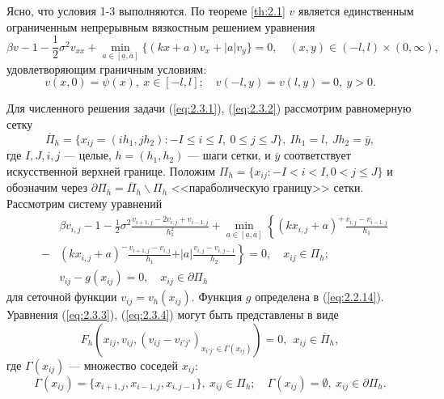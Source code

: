 Ясно, что условия 1-3 выполняются. По теореме \ref{th:2.1} $v$ является единственным ограниченным непрерывным вязкостным решением уравнения
\begin{equation} \label{eq:2.3.1}
\beta v -1-\frac{1}{2}\sigma^2 v_{xx}+\min_{a \in [\underline a,\overline{a}]}\{(kx+a)v_x+|a|v_y\}=0,\quad (x,y)\in (-l,l)\times(0,\infty),
\end{equation}
удовлетворяющим граничным условиям:
\begin{equation} \label{eq:2.3.2}
v(x,0)=\psi(x),\ x\in [-l,l];\quad v(-l,y)=v(l,y)=0,\  y>0.
\end{equation}

Для численного решения задачи (\ref{eq:2.3.1}), (\ref{eq:2.3.2}) рассмотрим равномерную сетку
$$\overline \Pi_h=\{x_{ij}=(ih_1,jh_2): -I \le i \le I, \ 0 \le j \le J\}, \ I h_1=l, \ Jh_2=\overline y,$$
где $I,J,i,j$ --- целые, $h=(h_1,h_2)$ --- шаги сетки, и $\overline y$ соответствует искусственной верхней границе.
Положим $\Pi_h=\{x_{ij}:-I<i<I, 0<j\le J\}$ и обозначим через $\partial \Pi_h=\overline \Pi_h\backslash \Pi_h$ <<параболическую границу>> сетки. Рассмотрим систему уравнений
\begin{eqnarray}
&  &\beta v_{i,j} -1-\frac{1}{2}\sigma^2 \frac{v_{i+1,j}-2v_{i,j}+v_{i-1,j}}{h^2_1}+\min_{a \in [\underline a,\overline a]} \left\{ (k x_{i,j}+a)^+\frac{v_{i,j}-v_{i-1,j}}{h_1}\right.\nonumber\\
 &-& (k x_{i,j}+a)^-\frac{v_{i+1,j}-v_{i,j}}{h_1} \left.+|a|\frac{v_{i,j}-v_{i,j-1}}{h_2} \right\}=0,\quad x_{ij}\in \Pi_h;\label{eq:2.3.3}\\
& & v_{ij}-g(x_{ij})=0,\quad x_{ij}\in \partial \Pi_h \label{eq:2.3.4}
\end{eqnarray}
для сеточной функции $v_{ij}=v_h(x_{ij})$. Функция $g$ определена в (\ref{eq:2.2.14}). Уравнения (\ref{eq:2.3.3}), (\ref{eq:2.3.4}) могут быть представлены в виде
\begin{equation} \label{eq:2.3.5}
F_h(x_{ij},v_{ij},(v_{ij}-v_{i'j'})_{x_{i'j'}\in\Gamma(x_{ij})})=0,\ \ x_{ij}\in \overline \Pi_h,
\end{equation}
где $\Gamma(x_{ij})$ --- множество соседей $x_{ij}$:
$$\Gamma(x_{ij})=\{x_{i+1,j},x_{i-1,j},x_{i,j-1}\},\ x_{ij}\in\Pi_h;
\quad\Gamma(x_{ij})=\emptyset,\ x_{ij}\in \partial \Pi_h.$$

